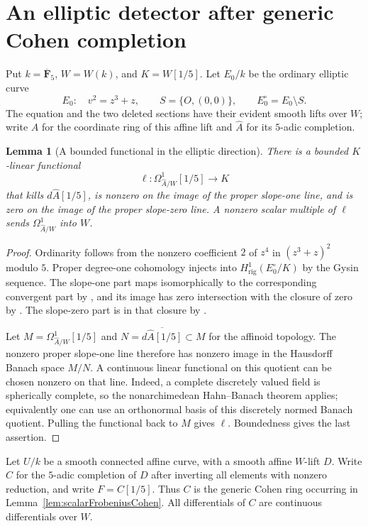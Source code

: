 \documentclass[11pt,a4paper]{article}
\newtheorem{lemma}[theorem]{Lemma}
\theoremstyle{remark}
\begin{document}
\section{An elliptic detector after generic Cohen completion}
\label{sec:dimtwoEllipticDetector}

Put $k=\overline{\mathbf F}_5$, $W=W(k)$, and $K=W[1/5]$.
Let $E_0/k$ be the ordinary elliptic curve
\[
 E_0:\quad v^2=z^3+z,
 \qquad S=\{O,(0,0)\},\qquad E_0^\circ=E_0\setminus S.
\]
The equation and the two deleted sections have their evident smooth
lifts over $W$; write $A$ for the coordinate ring of this affine lift
and $\widehat A$ for its $5$-adic completion.

\begin{lemma}[A bounded functional in the elliptic direction]
\label{lem:ellipticContinuousFunctional}
There is a bounded $K$-linear functional
\[
 \ell:\Omega^1_{\widehat A/W}[1/5]\longrightarrow K
\]
that kills $d\widehat A[1/5]$, is nonzero on the image of the proper
slope-one line, and is zero on the image of the proper slope-zero
line.  A nonzero scalar multiple of
$\ell$ sends $\Omega^1_{\widehat A/W}$ into $W$.
\end{lemma}

\begin{proof}
Ordinarity follows from the nonzero coefficient $2$ of $z^4$ in
$(z^3+z)^2$ modulo $5$.  Proper degree-one cohomology injects into
$H^1_{\mathrm{rig}}(E_0^\circ/K)$ by the Gysin sequence.  The slope-one
part maps isomorphically to the corresponding convergent part by
\cite[Theorem~7.3.1]{CaroDAddezioInjectivity}, and its image has zero
intersection with the closure of zero by
\cite[Theorem~7.3.6]{CaroDAddezioInjectivity}.  The slope-zero part is
in that closure by \cite[Theorem~7.2.1]{CaroDAddezioInjectivity}.

Let $M=\Omega^1_{\widehat A/W}[1/5]$ and
$N=\overline{d\widehat A[1/5]}\subset M$ for the affinoid topology.
The nonzero proper slope-one line therefore has nonzero image in the
Hausdorff Banach space $M/N$.  A continuous linear functional on this
quotient can be chosen nonzero on that line.  Indeed, a complete
discretely valued field is spherically complete, so the nonarchimedean
Hahn--Banach theorem applies; equivalently one can use an orthonormal
basis of this discretely normed Banach quotient.  Pulling the functional
back to $M$ gives $\ell$.  Boundedness gives the last assertion.
\end{proof}

Let $U/k$ be a smooth connected affine curve, with a smooth affine
$W$-lift $D$.  Write $C$ for the $5$-adic completion of $D$ after
inverting all elements with nonzero reduction, and write $F=C[1/5]$.
Thus $C$ is the generic Cohen ring occurring in
Lemma~\ref{lem:scalarFrobeniusCohen}.  All differentials of $C$ are
continuous differentials over $W$.
\end{document}
